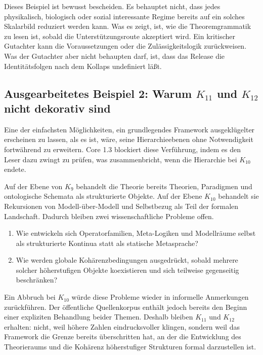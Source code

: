Dieses Beispiel ist bewusst bescheiden. Es behauptet nicht, dass jedes physikalisch,
biologisch oder sozial interessante Regime bereits auf ein solches Skalarbild reduziert werden kann. Was es
zeigt, ist, wie die Theoremgrammatik zu lesen ist, sobald die Unterstützungsroute akzeptiert wird. Ein
kritischer Gutachter kann die Voraussetzungen oder die Zulässigkeitslogik zurückweisen. Was der Gutachter
aber nicht behaupten darf, ist, dass das Release die Identitätsfolgen nach dem Kollaps undefiniert läßt.

\subsection{Ausgearbeitetes Beispiel 2: Warum \texorpdfstring{$K_{11}$}{K11} und \texorpdfstring{$K_{12}$}{K12} nicht dekorativ sind}

Eine der einfachsten Möglichkeiten, ein grundlegendes Framework ausgeklügelter erscheinen zu lassen, als es
ist, wäre, seine Hierarchieebenen ohne Notwendigkeit fortwährend zu erweitern. Core 1.3 blockiert diese
Verführung, indem es den Leser dazu zwingt zu prüfen, was zusammenbricht, wenn die Hierarchie bei
\(K_{10}\) endete.

Auf der Ebene von \(K_9\) behandelt die Theorie bereits Theorien, Paradigmen und ontologische Schemata als
strukturierte Objekte. Auf der Ebene \(K_{10}\) behandelt sie Rekursionen von Modell-über-Modell und
Selbstbezug als Teil der formalen Landschaft. Dadurch bleiben zwei wissenschaftliche Probleme offen.

\begin{enumerate}
\item Wie entwickeln sich Operatorfamilien, Meta-Logiken und Modellräume selbst als strukturierte
      Kontinua statt als statische Metasprache?
\item Wie werden globale Kohärenzbedingungen ausgedrückt, sobald mehrere solcher höherstufigen Objekte koexistieren
      und sich teilweise gegenseitig beschränken?
\end{enumerate}

Ein Abbruch bei \(K_{10}\) würde diese Probleme wieder in informelle Anmerkungen zurückführen. Der
öffentliche Quellenkorpus enthält jedoch bereits den Beginn einer expliziten Behandlung beider Themen. Deshalb
bleiben \(K_{11}\) und \(K_{12}\) erhalten: nicht, weil höhere Zahlen eindrucksvoller klingen, sondern
weil das Framework die Grenze bereits überschritten hat, an der die Entwicklung des Theorieraums und die
Kohärenz höherstufiger Strukturen formal darzustellen ist.

